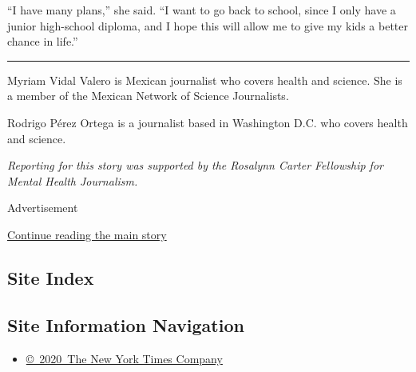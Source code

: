 ``I have many plans,'' she said. ``I want to go back to school, since I
only have a junior high-school diploma, and I hope this will allow me to
give my kids a better chance in life.''

\begin{center}\rule{0.5\linewidth}{\linethickness}\end{center}

Myriam Vidal Valero is Mexican journalist who covers health and science.
She is a member of the Mexican Network of Science Journalists.

Rodrigo Pérez Ortega is a journalist based in Washington D.C. who covers
health and science.

\emph{Reporting for this story was supported by the Rosalynn Carter
Fellowship for Mental Health Journalism.}

Advertisement

\protect\hyperlink{after-bottom}{Continue reading the main story}

\hypertarget{site-index}{%
\subsection{Site Index}\label{site-index}}

\hypertarget{site-information-navigation}{%
\subsection{Site Information
Navigation}\label{site-information-navigation}}

\begin{itemize}
\tightlist
\item
  \href{https://help.nytimes3xbfgragh.onion/hc/en-us/articles/115014792127-Copyright-notice}{©~2020~The
  New York Times Company}
\end{itemize}


